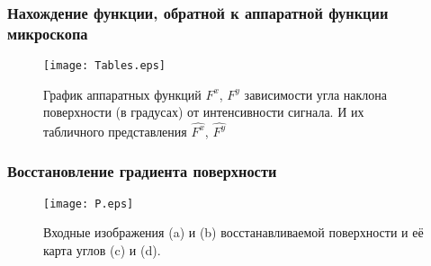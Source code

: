 \documentclass{beamer}
\begin{document}
\begin{frame}
    \frametitle{Нахождение функции, обратной к аппаратной функции микроскопа}
    \begin{figure}
        \texttt{[image: Tables.eps]}
        \caption{График аппаратных функций $F^x$, $F^y$ зависимости угла наклона поверхности (в градусах) от интенсивности сигнала. И их табличного представления $\hat{F^x}$, $\hat{F^y}$}
        {\label{fig:Tables}}%
    \end{figure}
\end{frame}

\begin{frame}
    \frametitle{Восстановление градиента поверхности}
    \begin{figure}
        \texttt{[image: P.eps]}
        \caption{Входные изображения (a) и (b) восстанавливаемой поверхности и её карта углов (c) и (d).}
        {\label{fig:Pyr}}%
    \end{figure}
\end{frame}
\end{document}
